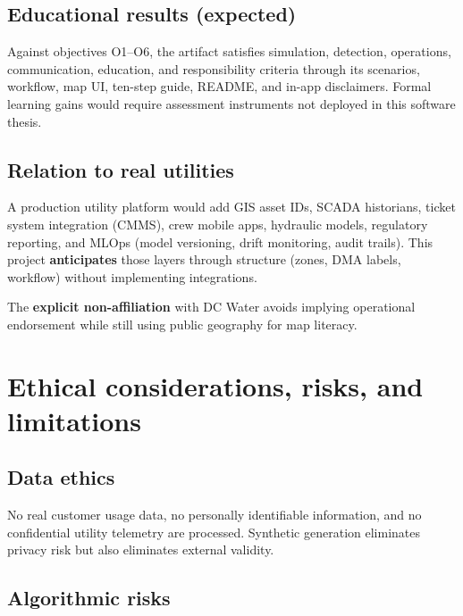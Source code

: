 \documentclass[12pt,a4paper]{article}
\begin{document}
\subsection{Educational results (expected)}

Against objectives O1--O6, the artifact satisfies simulation, detection, operations, communication, education, and responsibility criteria through its scenarios, workflow, map UI, ten-step guide, README, and in-app disclaimers. Formal learning gains would require assessment instruments not deployed in this software thesis.

\subsection{Relation to real utilities}

A production utility platform would add GIS asset IDs, SCADA historians, ticket system integration (CMMS), crew mobile apps, hydraulic models, regulatory reporting, and MLOps (model versioning, drift monitoring, audit trails). This project \textbf{anticipates} those layers through structure (zones, DMA labels, workflow) without implementing integrations.

The \textbf{explicit non-affiliation} with DC Water avoids implying operational endorsement while still using public geography for map literacy.

\section{Ethical considerations, risks, and limitations}
\label{sec:ethics}

\subsection{Data ethics}

No real customer usage data, no personally identifiable information, and no confidential utility telemetry are processed. Synthetic generation eliminates privacy risk but also eliminates external validity.

\subsection{Algorithmic risks}
\end{document}
